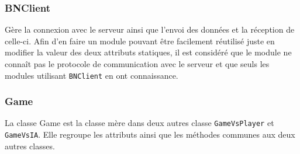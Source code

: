 \documentclass[12pt]{article}
\begin{document}
\bigskip

\subsubsection{BNClient}

Gère la connexion avec le serveur ainsi que l'envoi des données et la réception
de celle-ci. Afin d'en faire un module pouvant être facilement réutilisé juste
en modifier la valeur des deux attributs statiques, il est considéré que le
module ne connaît pas le protocole de communication avec le serveur et que
seuls les modules utilisant \texttt{BNClient} en ont connaissance.

\bigskip

\subsubsection{Game}

La classe Game est la classe mère dans deux autres classe \texttt{GameVsPlayer}
et \texttt{GameVsIA}. Elle regroupe les attributs ainsi que les méthodes
communes aux deux autres classes.

\bigskip
\end{document}
